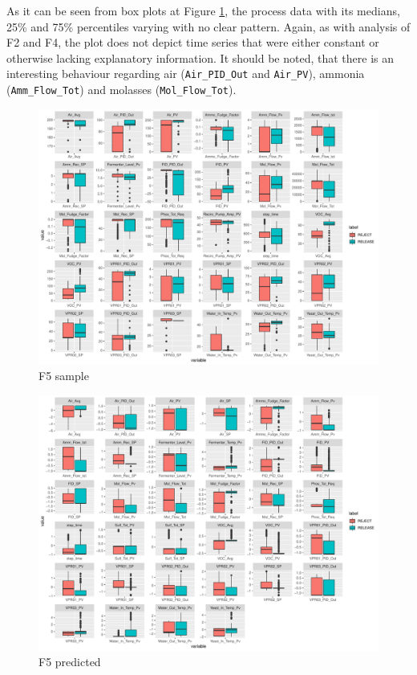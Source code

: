 As it can be seen from box plots at Figure \ref{fig:f5_sample}, the process data with its medians, 25\% and 75\% percentiles varying with no clear pattern. Again, as with analysis of F2 and F4, the plot does not depict time series that were either constant or otherwise lacking explanatory information. It should be noted, that there is an interesting behaviour regarding air (\texttt{Air\_PID\_Out} and \texttt{Air\_PV}), ammonia (\texttt{Amm\_Flow\_Tot}) and molasses (\texttt{Mol\_Flow\_Tot}). 

\begin{figure}[ht]
    \centering
    \includegraphics[width=1.0\textwidth]{plots/f5-sample.pdf}
    \caption{F5 sample}
    \label{fig:f5_sample}
\end{figure}

\begin{figure}[ht]
    \centering
    \includegraphics[width=1.0\textwidth]{plots/f5-predicted.pdf}
    \caption{F5 predicted}
    \label{fig:f5_predicted}
\end{figure}

